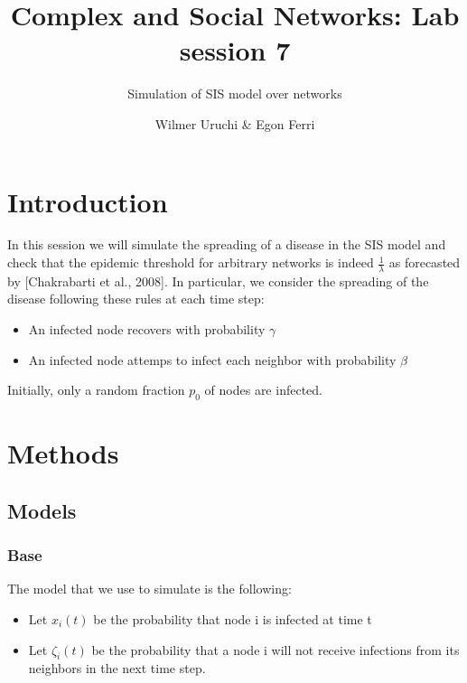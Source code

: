 \documentclass[]{article}
\title{Complex and Social Networks: Lab session 7}
\subtitle{Simulation of SIS model over networks}
\author{Wilmer Uruchi \& Egon Ferri}
\date{}
\providecommand{\tightlist}{%
  \setlength{\itemsep}{0pt}\setlength{\parskip}{0pt}}
\begin{document}
\maketitle

{
\hypersetup{linkcolor=black}
\setcounter{tocdepth}{2}
\tableofcontents
}
\section{Introduction}\label{introduction}

In this session we will simulate the spreading of a disease in the SIS
model and check that the epidemic threshold for arbitrary networks is
indeed \(\frac{1}{\lambda}\) as forecasted by {[}Chakrabarti et al.,
2008{]}. In particular, we consider the spreading of the disease
following these rules at each time step:

\begin{itemize}
\tightlist
\item
  An infected node recovers with probability \(\gamma\)
\item
  An infected node attemps to infect each neighbor with probability
  \(\beta\)
\end{itemize}

Initially, only a random fraction \(p_0\) of nodes are infected.

\section{Methods}\label{methods}

\subsection{Models}\label{models}

\subsubsection{Base}\label{base}

The model that we use to simulate is the following:

\begin{itemize}
\tightlist
\item
  Let \(x_i(t)\) be the probability that node i is infected at time t
\item
  Let \(\zeta_i(t)\) be the probability that a node i will not receive
  infections from its neighbors in the next time step.
\end{itemize}
\end{document}
